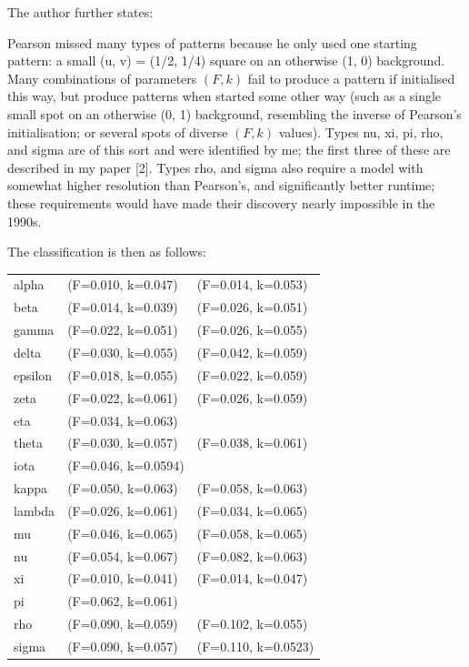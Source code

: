 The author further states:
\begin{displayquote}
{\color{darkgray}
Pearson missed many types of patterns because he only used one starting pattern: 
a small (u, v) = (1/2, 1/4) square on an otherwise (1, 0) background. Many combinations 
of parameters $(F,k)$ fail to produce 
a pattern if initialised this way, but produce patterns when started some other way 
(such as a single small spot on 
an otherwise (0, 1) background, resembling the inverse of Pearson's initialisation; or several spots of
diverse $(F,k)$ values). 
Types nu, xi, pi, rho, and sigma are of this sort and were identified by me; 
the first three of these are described in my paper [2]. 
Types rho, and sigma also require a model with somewhat higher 
resolution than Pearson's, and significantly better runtime; these requirements would have made their discovery 
nearly impossible in the 1990s.
}
\end{displayquote} 

The classification is then as follows:
\begin{center}
\begin{tabular}{lll}
\hline
alpha   & (F=0.010, k=0.047) &(F=0.014, k=0.053) \\
beta    & (F=0.014, k=0.039) &(F=0.026, k=0.051) \\
gamma   & (F=0.022, k=0.051) &(F=0.026, k=0.055) \\
delta   & (F=0.030, k=0.055) &(F=0.042, k=0.059) \\
epsilon & (F=0.018, k=0.055) &(F=0.022, k=0.059) \\
zeta    & (F=0.022, k=0.061) &(F=0.026, k=0.059) \\
eta     & (F=0.034, k=0.063) &	\\
theta   & (F=0.030, k=0.057) &(F=0.038, k=0.061) \\
iota    & (F=0.046, k=0.0594)   \\
kappa   & (F=0.050, k=0.063) &(F=0.058, k=0.063) \\
lambda  & (F=0.026, k=0.061) &(F=0.034, k=0.065) \\
mu      & (F=0.046, k=0.065) &(F=0.058, k=0.065) \\
nu      & (F=0.054, k=0.067) &(F=0.082, k=0.063) \\
xi      & (F=0.010, k=0.041) &(F=0.014, k=0.047) \\
pi      & (F=0.062, k=0.061) \\
rho     & (F=0.090, k=0.059) &(F=0.102, k=0.055) \\
sigma   & (F=0.090, k=0.057) &(F=0.110, k=0.0523)\\
\hline
\end{tabular}
\end{center}

